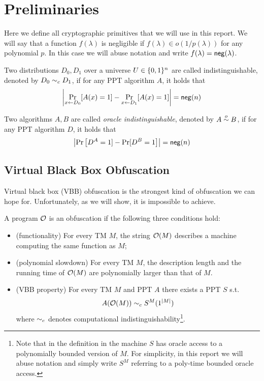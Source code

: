 \section{Preliminaries}
\label{sec:prel}
Here we define all cryptographic primitives that we will use in this report. We will say that a function $f(\lambda)$ is negligible if $f(\lambda)\in o(1/p(\lambda))$ for any polynomial $p$. In this case we will abuse notation and write $f(\lambda)=\mathsf{neg}(\lambda)$.

Two distributions $D_0,D_1$ over a universe $U\in\{0,1\}^n$ are called indistinguishable, denoted by $D_0\sim_c D_1$, if for any PPT algorithm $A$, it holds that
\[
\left|\Pr_{x\gets D_0}[A(x)=1]-\Pr_{x\gets D_1}[A(x)=1]\right|=\mathsf{neg}(n)
\]

Two algorithms $A,B$ are called \emph{oracle indistinguishable}, denoted by $A\overset{o}{\sim} B$, if for any PPT algorithm $D$, it holds that
\[
\left|\Pr\left[D^A=1]-\Pr[D^B=1\right]\right|=\mathsf{neg}(n)
\]

\subsection{Virtual Black Box Obfuscation}
\label{subsec:VBB}
Virtual black box (VBB) obfuscation is the strongest kind of obfuscation we can hope for. Unfortunately, as we will show, it is impossible to achieve.

\begin{mydef}[TM-obfuscator]
	\label{def:VBB-tm}
	A program $\mathcal{O}$ is an obfuscation if the following three conditions hold: %
	\begin{itemize}
		\item (functionality) For every TM $M$, the string $\mathcal{O}(M)$ describes a machine computing the same function as $M$;
		\item (polynomial slowdown)  For every TM $M$, the description length and the running time of $\mathcal{O}(M)$ are polynomially larger than that of $M$.
		\item (VBB property) For every TM $M$ and PPT $A$ there exists a PPT $S$ s.t. 
		$$ A(\mathcal{O}(M)) \sim_c S^M(1^{|M|}) $$
		where $\sim_c$ denotes computational indistinguishability\footnote{Note that in the definition in \cite{VBB-imp} the machine $S$ has oracle access to a polynomially bounded version of $M$. For simplicity, in this report we will abuse notation and simply write $S^M$ referring to a poly-time bounded oracle access. }.
	\end{itemize}
\end{mydef}

